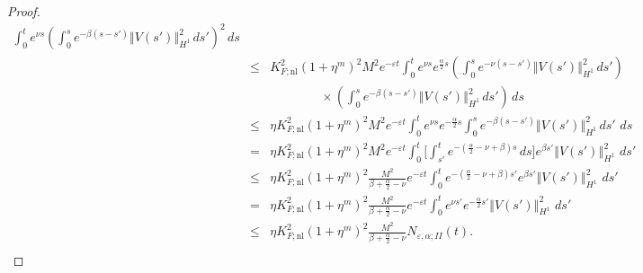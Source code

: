 \documentclass[10pt]{articleHJ}
\newcommand{\e}{\ensuremath{\varepsilon}}
\newcommand{\norm}[1]{\left\Vert#1\right\Vert}		%
\numberwithin{equation}{section}
\begin{document}
\begin{proof}
\begin{equation}
\begin{array}{lcl}
  \int_0^t e^{\nu s}
  \left(
     \int_0^{s} e^{- \beta(s - s') }
         \norm{V(s')}^2_{H^1} \, ds' \right)^2  \, ds
\\[0.2cm]
& \le &
  K_{F;\mathrm{nl}}^2 (1 + \eta^m )^2 M^2 e^{-\e t}
  \int_0^t e^{\nu s}
  e^{\frac{\alpha }{2}s }
  \left(
     \int_0^{s} e^{- \nu(s - s') }
         \norm{V(s')}^2_{H^1} \, ds' \right)
\\[0.2cm]
& & \qquad \qquad \times
\left(
     \int_0^{s} e^{- \beta(s - s') }
         \norm{V(s')}^2_{H^1} \, ds' \right)  \, ds
\\[0.2cm]
& \le &
  \eta K_{F;\mathrm{nl}}^2 (1 + \eta^m)^2 M^2 e^{-\e t}
  \int_0^t e^{\nu s} e^{-\frac{\alpha}{2}s }
     \int_0^{s} e^{- \beta(s - s') }
         \norm{V(s')}^2_{H^1} \, ds' \,  \, ds
\\[0.2cm]
& = &
   \eta K_{F;\mathrm{nl}}^2 (1 + \eta^m )^2 M^2 e^{-\e t}
     \int_0^{t}   \Big[ \int_{s'}^t  e^{- ( \frac{\alpha}{2} - \nu + \beta) s }  \, ds \Big]
        e^{ \beta s'} \norm{V(s')}_{H^1}^2 \,  \, ds'
\\[0.2cm]
%
& \le &
   \eta K_{F;\mathrm{nl}}^2 (1 + \eta^m )^2 \frac{M^2}{ \beta + \frac{\alpha}{2} - \nu }
      e^{-\e t}
     \int_0^{t}   e^{- ( \frac{\alpha}{2} - \nu + \beta) s' }  e^{ \beta s'} \norm{V(s')}_{H^1}^2 \,  \, ds'
\\[0.2cm]
& = &
   \eta K_{F;\mathrm{nl}}^2 (1 + \eta^m )^2 \frac{M^2}{ \beta + \frac{\alpha}{2} - \nu }
      e^{-\e t}
     \int_0^{t}  e^{\nu s'} e^{-  \frac{\alpha}{2}  s' }  \norm{V(s')}_{H^1}^2 \,  \, ds'
\\[0.2cm]
& \le &
   \eta K_{F;\mathrm{nl}}^2 (1 + \eta^m )^2 \frac{M^2}{ \beta + \frac{\alpha}{2} - \nu }
      N_{\e,\alpha;II}(t).
\\[0.2cm]
\end{array}
\end{equation}
\end{proof}
\end{document}
